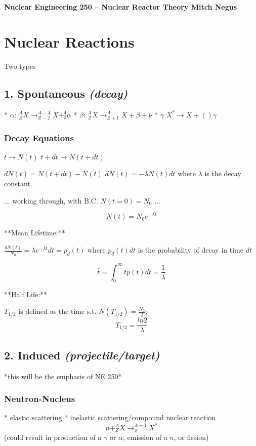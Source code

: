 \documentclass{report}
\begin{document}
\thispagestyle{empty}

{\bf {\large {Nuclear Engineering 250 -- Nuclear Reactor Theory \hfill Mitch Negus}}}

\section*{Nuclear Reactions}

Two types

\subsection*{1. Spontaneous \textit{(decay)}}

* $\alpha$: $^A_ZX \rightarrow ^{A-4}_{Z-2}X + ^4_2\alpha$
* $\beta$: $^A_ZX \rightarrow ^A_{Z+1}X + \beta + \bar{\nu}$
* $\gamma$ $X^* \rightarrow X +() \gamma$

\subsubsection*{Decay Equations}
$ t \rightarrow N(t) $  
$ t+dt \rightarrow N(t+dt) $

$dN(t) = N(t+dt) - N(t) $  
$dN(t) = -\lambda N(t) dt$ where $\lambda$ is the decay constant.

... working through, with B.C. $N(t=0) = N_0$ ...

$$N(t) = N_0 e^{-\lambda t}$$

**Mean Lifetime:** 

$\frac{dN(t)}{N_0} = \lambda e^{-\lambda t} dt = p_d(t)$ where $p_d(t) dt$ is the probability of decay in time $dt$

$$\bar{t} = \int_0^{\infty} t p(t) dt = \frac{1}{\lambda}$$

**Half Life:**

$T_{1/2}$ is defined as the time s.t. $N(T_{1/2}) = \frac{N_0}{2}$; 
$$T_{1/2} = \frac{ln2}{\lambda}$$

\subsection*{2. Induced \textit{(projectile/target)}}

*this will be the emphasis of NE 250*

\subsubsection*{ Neutron-Nucleus}

* elastic scattering
* inelastic scattering/compound nuclear reaction  
	$$n + ^A_ZX \rightarrow ^{A+1}_ZX^*$$
	(could result in production of a $\gamma$ or $\alpha$, emission of a $n$, or fission)
	
\end{document}
